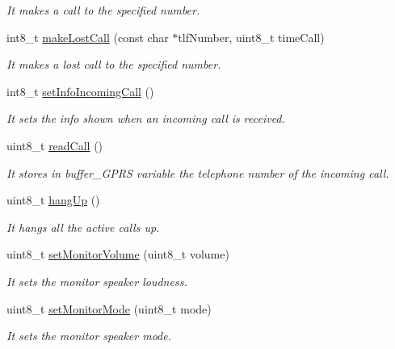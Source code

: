 \begin{DoxyCompactItemize}
\begin{DoxyCompactList}\small\item\em It makes a call to the specified number. \end{DoxyCompactList}\item 
int8\+\_\+t \hyperlink{class_wasp_g_p_r_s___pro__core_a32d4dfea68499c94a6a894351c0452a5}{make\+Lost\+Call} (const char $\ast$tlf\+Number, uint8\+\_\+t time\+Call)
\begin{DoxyCompactList}\small\item\em It makes a lost call to the specified number. \end{DoxyCompactList}\item 
int8\+\_\+t \hyperlink{class_wasp_g_p_r_s___pro__core_a2b607585bce7e7dc8f6bb12c87186ed2}{set\+Info\+Incoming\+Call} ()
\begin{DoxyCompactList}\small\item\em It sets the info shown when an incoming call is received. \end{DoxyCompactList}\item 
uint8\+\_\+t \hyperlink{class_wasp_g_p_r_s___pro__core_a5ea9f1654c17cfeeaedf79069c77af75}{read\+Call} ()
\begin{DoxyCompactList}\small\item\em It stores in \textquotesingle{}buffer\+\_\+\+G\+P\+RS\textquotesingle{} variable the telephone number of the incoming call. \end{DoxyCompactList}\item 
uint8\+\_\+t \hyperlink{class_wasp_g_p_r_s___pro__core_a0080fde2dbbe4da270bdf5d9ef8929f1}{hang\+Up} ()
\begin{DoxyCompactList}\small\item\em It hangs all the active calls up. \end{DoxyCompactList}\item 
uint8\+\_\+t \hyperlink{class_wasp_g_p_r_s___pro__core_a1ae4f91fbbdb3dcd1476e7bc202476e9}{set\+Monitor\+Volume} (uint8\+\_\+t volume)
\begin{DoxyCompactList}\small\item\em It sets the monitor speaker loudness. \end{DoxyCompactList}\item 
uint8\+\_\+t \hyperlink{class_wasp_g_p_r_s___pro__core_af3bbadb785fc609d4327d545d4435ae2}{set\+Monitor\+Mode} (uint8\+\_\+t mode)
\begin{DoxyCompactList}\small\item\em It sets the monitor speaker mode. \end{DoxyCompactList}\item 

\end{DoxyCompactItemize}
